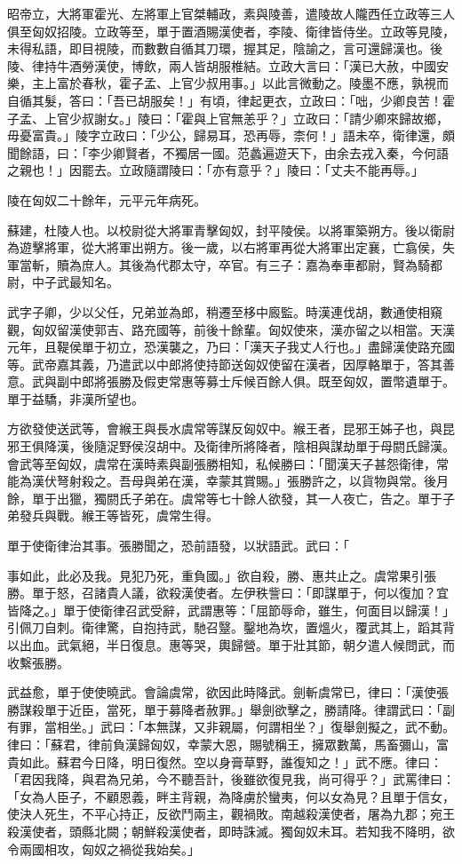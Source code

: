 \begin{pinyinscope}
昭帝立，大將軍霍光、左將軍上官桀輔政，素與陵善，遣陵故人隴西任立政等三人俱至匈奴招陵。立政等至，單于置酒賜漢使者，李陵、衛律皆侍坐。立政等見陵，未得私語，即目視陵，而數數自循其刀環，握其足，陰諭之，言可還歸漢也。後陵、律持牛酒勞漢使，博飲，兩人皆胡服椎結。立政大言曰：「漢已大赦，中國安樂，主上富於春秋，霍子孟、上官少叔用事。」以此言微動之。陵墨不應，孰視而自循其髮，答曰：「吾已胡服矣！」有頃，律起更衣，立政曰：「咄，少卿良苦！霍子孟、上官少叔謝女。」陵曰：「霍與上官無恙乎？」立政曰：「請少卿來歸故鄉，毋憂富貴。」陵字立政曰：「少公，歸易耳，恐再辱，柰何！」語未卒，衛律還，頗聞餘語，曰：「李少卿賢者，不獨居一國。范蠡遍遊天下，由余去戎入秦，今何語之親也！」因罷去。立政隨謂陵曰：「亦有意乎？」陵曰：「丈夫不能再辱。」

陵在匈奴二十餘年，元平元年病死。

蘇建，杜陵人也。以校尉從大將軍青擊匈奴，封平陵侯。以將軍築朔方。後以衛尉為遊擊將軍，從大將軍出朔方。後一歲，以右將軍再從大將軍出定襄，亡翕侯，失軍當斬，贖為庶人。其後為代郡太守，卒官。有三子：嘉為奉車都尉，賢為騎都尉，中子武最知名。

武字子卿，少以父任，兄弟並為郎，稍遷至栘中廄監。時漢連伐胡，數通使相窺觀，匈奴留漢使郭吉、路充國等，前後十餘輩。匈奴使來，漢亦留之以相當。天漢元年，且鞮侯單于初立，恐漢襲之，乃曰：「漢天子我丈人行也。」盡歸漢使路充國等。武帝嘉其義，乃遣武以中郎將使持節送匈奴使留在漢者，因厚輅單于，答其善意。武與副中郎將張勝及假吏常惠等募士斥候百餘人俱。既至匈奴，置幣遺單于。單于益驕，非漢所望也。

方欲發使送武等，會緱王與長水虞常等謀反匈奴中。緱王者，昆邪王姊子也，與昆邪王俱降漢，後隨浞野侯沒胡中。及衛律所將降者，陰相與謀劫單于母閼氏歸漢。會武等至匈奴，虞常在漢時素與副張勝相知，私候勝曰：「聞漢天子甚怨衛律，常能為漢伏弩射殺之。吾母與弟在漢，幸蒙其賞賜。」張勝許之，以貨物與常。後月餘，單于出獵，獨閼氏子弟在。虞常等七十餘人欲發，其一人夜亡，告之。單于子弟發兵與戰。緱王等皆死，虞常生得。

單于使衛律治其事。張勝聞之，恐前語發，以狀語武。武曰：「

事如此，此必及我。見犯乃死，重負國。」欲自殺，勝、惠共止之。虞常果引張勝。單于怒，召諸貴人議，欲殺漢使者。左伊秩訾曰：「即謀單于，何以復加？宜皆降之。」單于使衛律召武受辭，武謂惠等：「屈節辱命，雖生，何面目以歸漢！」引佩刀自刺。衛律驚，自抱持武，馳召毉。鑿地為坎，置熅火，覆武其上，蹈其背以出血。武氣絕，半日復息。惠等哭，輿歸營。單于壯其節，朝夕遣人候問武，而收繫張勝。

武益愈，單于使使曉武。會論虞常，欲因此時降武。劍斬虞常已，律曰：「漢使張勝謀殺單于近臣，當死，單于募降者赦罪。」舉劍欲擊之，勝請降。律謂武曰：「副有罪，當相坐。」武曰：「本無謀，又非親屬，何謂相坐？」復舉劍擬之，武不動。律曰：「蘇君，律前負漢歸匈奴，幸蒙大恩，賜號稱王，擁眾數萬，馬畜彌山，富貴如此。蘇君今日降，明日復然。空以身膏草野，誰復知之！」武不應。律曰：「君因我降，與君為兄弟，今不聽吾計，後雖欲復見我，尚可得乎？」武罵律曰：「女為人臣子，不顧恩義，畔主背親，為降虜於蠻夷，何以女為見？且單于信女，使決人死生，不平心持正，反欲鬥兩主，觀禍敗。南越殺漢使者，屠為九郡；宛王殺漢使者，頭縣北闕；朝鮮殺漢使者，即時誅滅。獨匈奴未耳。若知我不降明，欲令兩國相攻，匈奴之禍從我始矣。」


\end{pinyinscope}
